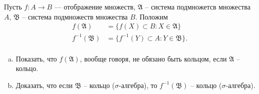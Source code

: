 \begin{task}{4}
Пусть $f: A \rightarrow B$ --- отображение множеств, $\mathfrak{A}$ -- система подмножетсв множества $A$, $\mathfrak{B}$ -- система подмножеств множества $B$. Положим
\begin{align*}
    f(\mathfrak{A}) &= \{f(X) \subset B: X \in \mathfrak{A}\}\\
    f^{-1}(\mathfrak{B}) &= \{f^{-1}(Y) \subset A: Y \in \mathfrak{B}\}.\\
\end{align*}
\begin{enumerate}[(a)]
    \item Показать, что $f(\mathfrak{A})$, вообще говоря, не обязано быть кольцом, если $\mathfrak{A}$ -- кольцо.
    \item Доказать, что если $\mathfrak{B}$ -- кольцо ($\sigma$-алгебра), то $f^{-1}(\mathfrak{B})$ -- кольцо ($\sigma$-алгебра).
\end{enumerate}

\end{task}
